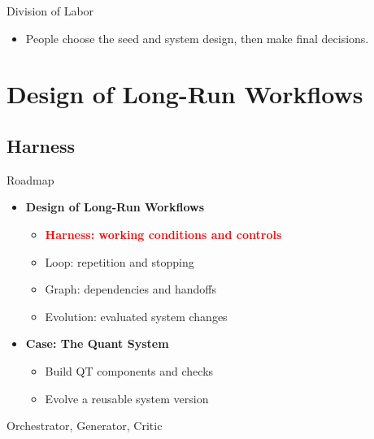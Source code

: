 \begin{frame}{Division of Labor}
\begin{center}
\resizebox{.96\textwidth}{!}{}
\end{center}
\begin{itemize}
\item People choose the seed and system design, then make final decisions.
\end{itemize}
\end{frame}

\section{Design of Long-Run Workflows}
\subsection{Harness}
\begin{frame}{Roadmap}
\begin{itemize}
\item \textbf{Design of Long-Run Workflows}
\begin{itemize}
\item \textcolor{red}{\textbf{Harness: working conditions and controls}}
\item Loop: repetition and stopping
\item Graph: dependencies and handoffs
\item Evolution: evaluated system changes
\end{itemize}
\item \textbf{Case: The Quant System}
\begin{itemize}
\item Build QT components and checks
\item Evolve a reusable system version
\end{itemize}
\end{itemize}
\end{frame}

\begin{frame}{Orchestrator, Generator, Critic}
\begin{center}
\resizebox{.94\textwidth}{!}{}
\end{center}
\end{frame}

